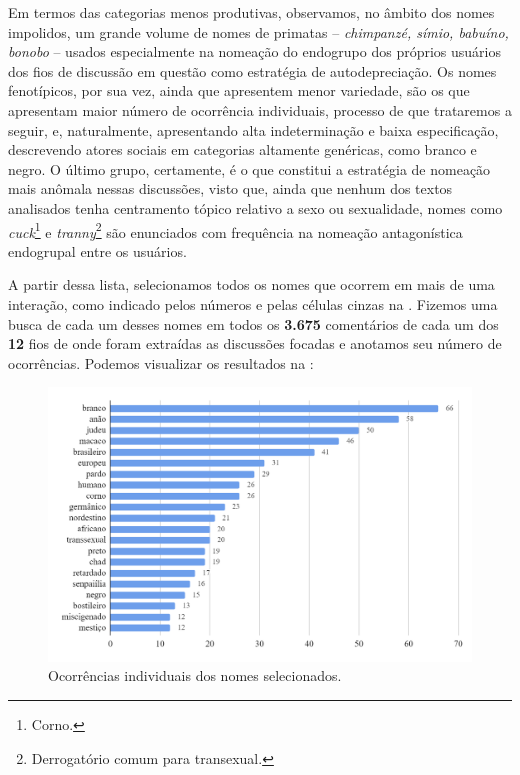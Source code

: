 \documentclass[portuguese]{textolivre}
\begin{document}
Em termos das categorias menos produtivas, observamos, no âmbito dos nomes impolidos, um grande volume de nomes de primatas – \emph{chimpanzé, símio, babuíno, bonobo} – usados especialmente na nomeação do endogrupo dos próprios usuários dos fios de discussão em questão como estratégia de autodepreciação. Os nomes fenotípicos, por sua vez, ainda que apresentem menor variedade, são os que apresentam maior número de ocorrência individuais, processo de que trataremos a seguir, e, naturalmente, apresentando alta indeterminação e baixa especificação, descrevendo atores sociais em categorias altamente genéricas, como branco e negro. O último grupo, certamente, é o que constitui a estratégia de nomeação mais anômala nessas discussões, visto que, ainda que nenhum dos textos analisados tenha centramento tópico relativo a sexo ou sexualidade, nomes como \emph{cuck}\footnote{Corno.} e \emph{tranny}\footnote{Derrogatório comum para transexual.} são enunciados com frequência na nomeação antagonística endogrupal entre os usuários.

A partir dessa lista, selecionamos todos os nomes que ocorrem em mais de uma interação, como indicado pelos números e pelas células cinzas na . Fizemos uma busca de cada um desses nomes em todos os \textbf{3.675} comentários de cada um dos \textbf{12} fios de onde foram extraídas as discussões focadas e anotamos seu número de ocorrências. Podemos visualizar os resultados na : 

\begin{figure}[h!]
\centering
\begin{minipage}{.8\textwidth}
 \includegraphics[width=\textwidth]{image3.png}
 \caption[Ocorrência dos nomes selecionados]{Ocorrências individuais dos nomes selecionados\footnotemark.}
 \label{fig3}
\end{minipage}
\end{figure}
\end{document}
